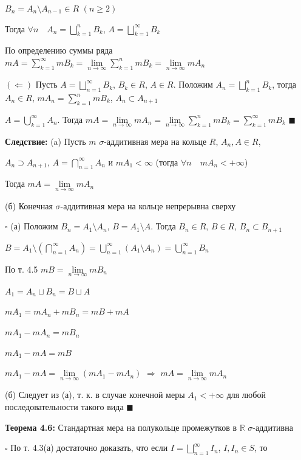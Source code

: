 \documentclass[a4paper]{report}
\begin{document}
\noindent$B_n=A_n\setminus A_{n-1}\in R$ $(n\ge2)$

Тогда $\forall n\quad A_n=\bigsqcup\limits_{k=1}^n B_k$, $A=\bigsqcup\limits_{k=1}^\infty B_k$

По определению суммы ряда $mA=\sum\limits_{k=1}^\infty mB_k=\lim\limits_{n\to\infty}\sum\limits_{k=1}^n mB_k=\lim
\limits_{n\to\infty}mA_n$

$(\Leftarrow)$ Пусть $A=\bigsqcup\limits_{n=1}^\infty B_k$, $B_k\in R$, $A\in R$. Положим $A_n=\bigsqcup\limits_{k=1}^n B_k$,
тогда $A_n\in R$, $mA_n=\sum\limits_{k=1}^n mB_k$, $A_n\subset A_{n+1}$

$A=\bigcup\limits_{k=1}^\infty A_n$. Тогда $mA=\lim\limits_{n\to\infty}mA_n=\lim\limits_{n\to\infty}\sum\limits_{k=1}^n mB_k=
\sum\limits_{k=1}^\infty mB_k$ $\blacksquare$
\bigskip

\noindent\textbf{Следствие:} (a) Пусть $m$ $\sigma$-аддитивная мера на кольце $R$, $A_n,A\in R$,

\noindent $A_n\supset A_{n+1}$, $A=\bigcap\limits_{n=1}^\infty A_n$ и $mA_1<\infty$ (тогда $\forall n\quad mA_n<+\infty$)

Тогда $mA=\lim\limits_{n\to\infty} mA_n$

(б) Конечная $\sigma$-аддитивная мера на кольце непрерывна сверху

\noindent $\square$ (а) Положим $B_n=A_1\setminus A_n$, $B=A_1\setminus A$. Тогда $B_n\in R$, $B\in R$, $B_n\subset B_{n+1}$

$B=A_1\setminus\left(\bigcap\limits_{n=1}^\infty A_n\right)=\bigcup\limits_{n=1}^\infty\left(A_1\setminus A_n\right)=
\bigcup\limits_{n=1}^\infty B_n$

По т. 4.5 $m B=\lim\limits_{n\to\infty} mB_n$

$A_1=A_n\sqcup B_n=B\sqcup A$

$mA_1=mA_n+mB_n=mB+mA$

$mA_1-mA_n=mB_n$

$mA_1-mA=mB$

$mA_1-mA=\lim\limits_{n\to\infty}(mA_1-mA_n)$ $\Rightarrow$ $mA=\lim\limits_{n\to\infty} mA_n$

(б) Следует из (а), т. к. в случае конечной меры $A_1<+\infty$ для любой последовательности такого вида $\blacksquare$
\bigskip

\noindent\textbf{Теорема 4.6:} Стандартная мера на полукольце промежутков в $\mathbb R$ $\sigma$-аддитивна

\noindent $\square$ По т. 4.3(а) достаточно доказать, что если $I=\bigsqcup\limits_{n=1}^\infty I_n$, $I,I_n\in S$, то
\end{document}
